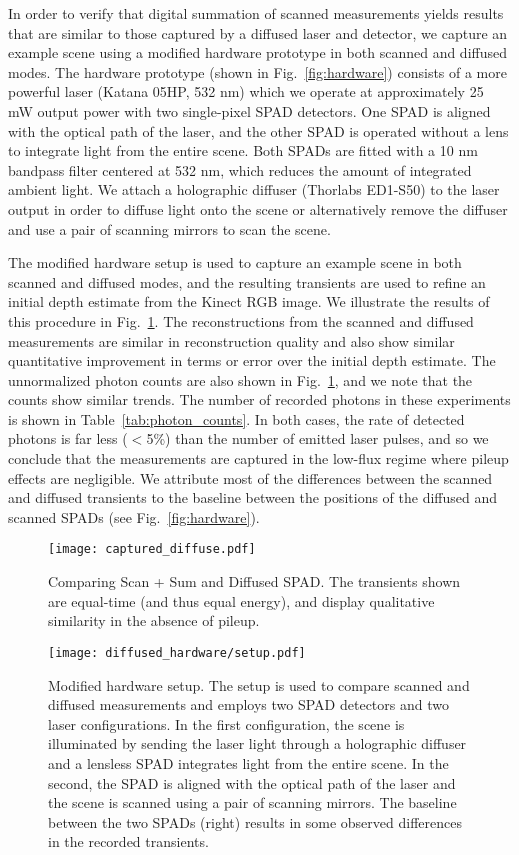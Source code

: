 \documentclass[runningheads]{llncs}
\begin{document}
In order to verify that digital summation of scanned measurements yields results
that are similar to those captured by a diffused laser and detector, we capture
an example scene using a modified hardware prototype in both scanned and
diffused modes. The hardware prototype (shown in Fig.~\ref{fig:hardware})
consists of a more powerful laser (Katana 05HP, 532 nm) which we operate at
approximately 25 mW output power with two single-pixel SPAD detectors. One SPAD
is aligned with the optical path of the laser, and the other SPAD is operated
without a lens to integrate light from the entire scene. Both SPADs are fitted
with a 10 nm bandpass filter centered at 532 nm, which reduces the amount of
integrated ambient light. We attach a holographic diffuser (Thorlabs ED1-S50) to
the laser output in order to diffuse light onto the scene or alternatively
remove the diffuser and use a pair of scanning mirrors to scan the scene.

The modified hardware setup is used to capture an example scene in both scanned and
diffused modes, and the resulting transients are used to refine an initial depth
estimate from the Kinect RGB image. We illustrate the results of this procedure
in Fig.~\ref{fig:comparison}. The reconstructions from the scanned and diffused
measurements are similar in reconstruction quality and also show similar
quantitative improvement in terms or error over the initial depth estimate. The
unnormalized photon counts are also shown in Fig.~\ref{fig:comparison}, and we
note that the counts show similar trends. The number of recorded photons in
these experiments is shown in Table~\ref{tab:photon_counts}. In both cases, the
rate of detected photons is far less ($<$5\%) than the number of emitted laser
pulses, and so we conclude that the measurements are captured in the low-flux
regime where pileup effects are negligible. We attribute most of the differences
between the scanned and diffused transients to the baseline between the
positions of the diffused and scanned SPADs (see Fig.~\ref{fig:hardware}).
\begin{figure}[H]
  \centering \texttt{[image: captured\_diffuse.pdf]}
  \caption{Comparing Scan + Sum and Diffused SPAD. The transients shown are
    equal-time (and thus equal energy), and display qualitative similarity in
    the absence of pileup.}
  \label{fig:comparison}
\end{figure}
  
\begin{figure}[H]
  \centering \texttt{[image: diffused\_hardware/setup.pdf]}
  \caption{Modified hardware setup. The setup is used to compare scanned and
  diffused measurements and employs two SPAD detectors and two laser
  configurations. In the first configuration, the scene is illuminated by
  sending the laser light through a holographic diffuser and a lensless SPAD 
  integrates light from the entire scene. In the second, the SPAD is aligned
  with the optical path of the laser and the scene is scanned using a pair of
  scanning mirrors. The baseline between the two SPADs (right) results in some
  observed differences in the recorded transients.}
  \label{fig:dither}
\end{figure}
\end{document}
